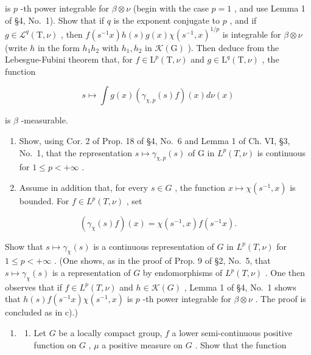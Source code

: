 is \(p\) -th power integrable for \(\beta \otimes \nu\) (begin with the case \(p = 1\) , and use Lemma 1 of §4, No.~1). Show that if \(q\) is the exponent conjugate to \(p\) , and if \(g \in \mathcal{L}^q(\mathrm{T}, \nu)\) , then \(f(s^{-1}x)h(s)g(x)\chi(s^{-1},x)^{1/p}\) is integrable for \(\beta\otimes\nu\) (write \(h\) in the form \(h_1h_2\) with \(h_1,h_2\) in \(\mathcal{K}(\mathrm{G})\) ). Then deduce from the Lebesgue-Fubini theorem that, for \(f\in\mathrm{L}^{p}(\mathrm{T},\nu)\) and \(g\in\mathrm{L}^{q}(\mathrm{T},\nu)\) , the function

\[
s \mapsto \int g (x) (\gamma_ {\chi , p} (s) f) (x) d \nu (x)
\]

is \(\beta\) -measurable.

\begin{enumerate}
\def\labelenumi{\alph{enumi})}
\setcounter{enumi}{2}
\item
  Show, using Cor. 2 of Prop. 18 of §4, No.~6 and Lemma 1 of Ch. VI, §3, No.~1, that the representation \(s \mapsto \gamma_{\chi,p}(s)\) of G in \(L^p(T, \nu)\) is continuous for \(1 \leqslant p < +\infty\) .
\item
  Assume in addition that, for every \(s \in G\) , the function \(x \mapsto \chi(s^{-1}, x)\) is bounded. For \(f \in L^{p}(T, \nu)\) , set
\end{enumerate}

\[
\left(\gamma_ {\chi} (s) f\right) (x) = \chi (s ^ {- 1}, x) f (s ^ {- 1} x).
\]

Show that \(s \mapsto \gamma_{\chi}(s)\) is a continuous representation of \(G\) in \(L^p(T, \nu)\) for \(1 \leqslant p < +\infty\) . (One shows, as in the proof of Prop. 9 of §2, No.~5, that \(s \mapsto \gamma_{\chi}(s)\) is a representation of \(G\) by endomorphisms of \(L^p(T, \nu)\) . One then observes that if \(f \in L^p(T, \nu)\) and \(h \in \mathcal{K}(G)\) , Lemma 1 of §4, No.~1 shows that \(h(s)f(s^{-1}x)\chi(s^{-1}, x)\) is \(p\) -th power integrable for \(\beta \otimes \nu\) . The proof is concluded as in c).)

\begin{enumerate}
\def\labelenumi{\arabic{enumi})}
\setcounter{enumi}{13}
\tightlist
\item
  \begin{enumerate}
  \def\labelenumii{\alph{enumii})}
  \tightlist
  \item
    Let \(G\) be a locally compact group, \(f\) a lower semi-continuous positive function on \(G\) , \(\mu\) a positive measure on \(G\) . Show that the function
  \end{enumerate}
\end{enumerate}

